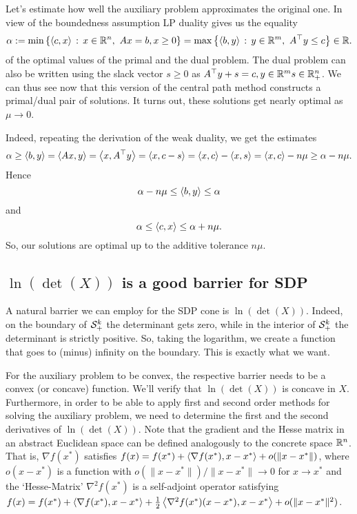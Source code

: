 	Let's estimate how well the auxiliary problem approximates the original one. In view of the boundedness assumption LP duality gives us the equality
	\[
		\alpha := \min \left\{  \left\langle c , x \right\rangle  \,:\, x \in \mathbb{R}^n, \ A x = b, x \ge 0 \right\} = \max \left\{  \left\langle b , y \right\rangle \,:\,  y \in \mathbb{R}^m, \ A^\top y \le c \right\} \in \mathbb{R}.
	\]
	of the optimal values of the primal and the dual problem. 
	The dual problem can also be written using the slack vector $s \ge 0$ as $A^\top y + s = c, y \in \mathbb{R}^m s \in \mathbb{R}_+^n$. We can thus see now that this version of the central path method constructs a primal/dual pair of solutions. It turns out, these solutions get nearly optimal as $\mu \to 0$. 
	
	Indeed, repeating the derivation of the weak duality, we get the estimates
	\[
		\alpha \ge \left\langle b , y \right\rangle = \left\langle A x , y \right\rangle= \left\langle x , A^\top y \right\rangle = \left\langle x , c-s \right\rangle = \left\langle x , c \right\rangle - \left\langle x , s \right\rangle = \left\langle x , c \right\rangle - n \mu \ge \alpha - n \mu.
	\]
	Hence 
	\[
		\alpha - n \mu \le \left\langle b , y \right\rangle \le \alpha 
	\]
	and 
	\[
		\alpha \le \left\langle c , x \right\rangle \le \alpha + n \mu.
	\]
	So, our solutions are optimal up to the additive tolerance $n \mu$. 

\subsection{\texorpdfstring{$\ln(\det(X))$}{ln(det(X))} is a good barrier for SDP}

A natural barrier we can employ for the SDP cone is $\ln(\det(X))$. Indeed, on the boundary of $\mathcal{S}_+^k$ the determinant gets zero, while in the interior of $\mathcal{S}_+^k$ the determinant is strictly positive. So, taking the logarithm, we create a function that goes to (minus) infinity on the boundary. This is exactly what we want. 

For the auxiliary problem to be convex, the respective barrier needs to be a convex (or concave) function. We'll verify that $\ln(\det(X))$ is concave in $X$. Furthermore, in order to be able to apply first and second order methods for solving the auxiliary problem, we need to determine the first and the second derivatives of $\ln(\det(X))$. Note that the gradient and the Hesse matrix in an abstract Euclidean space can be defined analogously to the concrete space $\mathbb{R}^n$. That is, $\nabla f(x^\ast)$ satisfies $f(x) = f(x^\ast) + \left\langle \nabla f(x^\ast) , x-x^\ast \right\rangle + o(\|x-x^\ast\|)$, where $o(x-x^\ast)$ is a function with $o(\|x-x^\ast\|) / \|x-x^\ast\| \to 0$ for $x \to x^\ast$ and the `Hesse-Matrix' $\nabla^2 f(x^\ast)$ is a self-adjoint operator satisfying $f(x) = f(x^\ast) + \left\langle \nabla f(x^\ast) , x-x^\ast \right\rangle + \frac{1}{2} \left\langle \nabla^2 f(x^\ast) (x-x^\ast) , x-x^\ast \right\rangle + o(\|x-x^\ast\|^2)$. 


